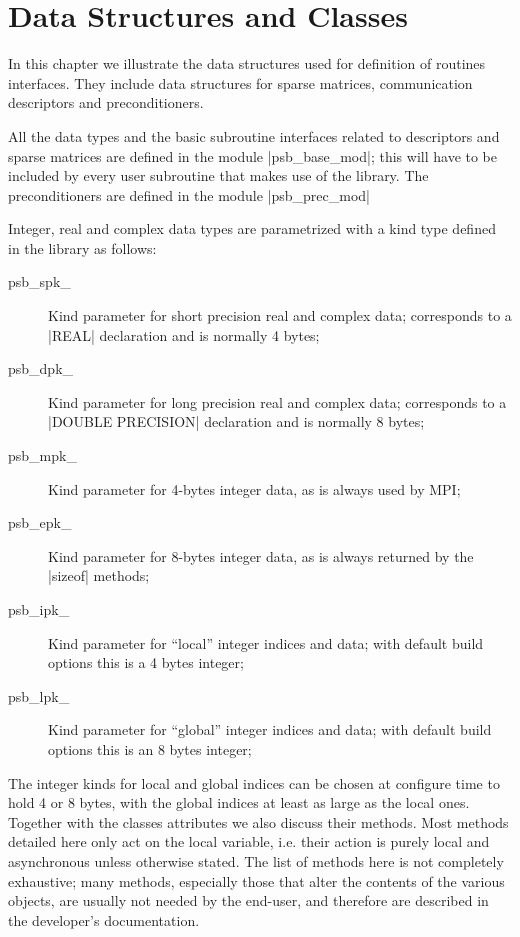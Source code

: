\section{Data Structures and Classes}
\label{sec:datastruct}

In this chapter we  illustrate the  data structures used for definition of
routines interfaces. They  include data structures for sparse matrices,
communication descriptors and preconditioners.%

All the data types and the basic subroutine interfaces related to
descriptors and sparse matrices are defined in
the module \fortinline|psb_base_mod|; this will have to be included by every
user subroutine that makes use of the library. The preconditioners are
defined in the module \fortinline|psb_prec_mod|

Integer, real and complex data types are parametrized with a kind type
defined in the library as follows: 
\begin{description}
\item[psb\_spk\_] Kind parameter for short precision real and complex
  data; corresponds to a \fortinline|REAL| declaration and is
  normally 4 bytes; 
\item[psb\_dpk\_] Kind parameter for long precision real and complex
  data; corresponds to a \fortinline|DOUBLE PRECISION| declaration and is
  normally 8 bytes;
\item[psb\_mpk\_] Kind parameter for 4-bytes integer data, as is
  always used by MPI; 
\item[psb\_epk\_] Kind parameter for 8-bytes integer data, as is
  always returned by the \fortinline|sizeof| methods;
\item[psb\_ipk\_] Kind parameter for ``local'' integer indices and data;
  with default build options this is a 4 bytes integer;
\item[psb\_lpk\_] Kind parameter for ``global'' integer indices and data;
  with default build options this is an 8 bytes integer;
\end{description}
The integer kinds for local and global indices can be chosen at
configure time to hold 4 or 8 bytes, with the global indices at least
as large as the local ones. 
Together with the classes attributes we also discuss their
methods.  Most methods detailed here only act on the local variable,
i.e. their action is purely local and asynchronous unless otherwise
stated. 
The list of methods here is not completely exhaustive; many methods,
especially those that alter the contents of the various objects, are
usually not needed by the end-user, and therefore are described in the
developer's documentation. 


